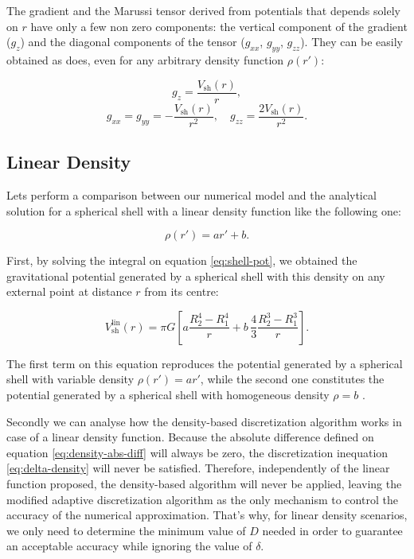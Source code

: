 \documentclass[extra]{gji}
\begin{document}
The gradient and the Marussi tensor derived from potentials that
depends solely on $r$ have only a few non zero components: the vertical
component of the gradient ($g_z$) and the diagonal components of the
tensor ($g_{xx}$, $g_{yy}$, $g_{zz}$).
They can be easily obtained as \citet{Grombein2013} does, even for any
arbitrary density function $\rho(r')$:

\begin{equation}
    g_z = \frac{V_\text{sh}(r)}{r},
\end{equation}
\begin{equation}
    g_{xx} = g_{yy} = -\frac{V_\text{sh}(r)}{r^2}, \quad
    g_{zz} = \frac{2V_\text{sh}(r)}{r^2}.
\end{equation}


\subsection{Linear Density}

Lets perform a comparison between our numerical model and the
analytical solution for a spherical shell with a linear density
function like the following one:

\begin{equation}
    \rho(r') = ar' + b.
\end{equation}

First, by solving the integral on equation \ref{eq:shell-pot}, we obtained the
gravitational potential generated by a spherical shell with this density on
any external point at distance $r$ from its centre:

\begin{equation}
    V_\text{sh}^\text{lin}(r) = \pi G \left[
    a \frac{R_2^4 - R_1^4}{r} +
    b \,\frac{4}{3} \frac{R_2^3 - R_1^3}{r} \right].
    \label{eq:shell-pot-linear}
\end{equation}

\noindent The first term on this equation reproduces the potential generated
by a spherical shell with variable density $\rho(r') = ar'$, while the second
one constitutes the potential generated by a spherical shell with homogeneous
density $\rho = b$ \citep{Mikuska2006,Grombein2013}.

Secondly we can analyse how the density-based discretization algorithm
works in case of a linear density function.
Because the absolute difference defined on equation
\ref{eq:density-abs-diff} will always be zero, the discretization
inequation \ref{eq:delta-density} will never be satisfied.
Therefore, independently of the linear function proposed, the
density-based algorithm will never be applied, leaving the modified
adaptive discretization algorithm as the only mechanism to control the
accuracy of the numerical approximation.
That's why, for linear density scenarios, we only need to determine
the minimum value of $D$ needed in order to guarantee an acceptable
accuracy while ignoring the value of $\delta$.
\end{document}
